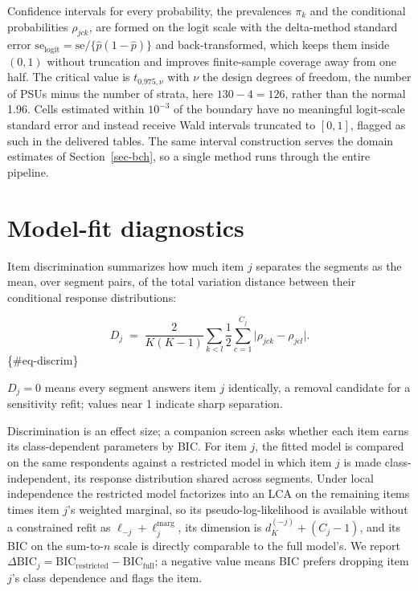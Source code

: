 \documentclass[
  12pt]{article}
\begin{document}
Confidence intervals for every probability, the prevalences \(\pi_k\)
and the conditional probabilities \(\rho_{jck}\), are formed on the
logit scale with the delta-method standard error
\(\mathrm{se}_{\mathrm{logit}} = \mathrm{se} / \{\hat p (1 - \hat p)\}\)
and back-transformed, which keeps them inside \((0, 1)\) without
truncation and improves finite-sample coverage away from one half. The
critical value is \(t_{0.975, \nu}\) with \(\nu\) the design degrees of
freedom, the number of PSUs minus the number of strata, here
\(130 - 4 = 126\), rather than the normal 1.96. Cells estimated within
\(10^{-3}\) of the boundary have no meaningful logit-scale standard
error and instead receive Wald intervals truncated to \([0, 1]\),
flagged as such in the delivered tables. The same interval construction
serves the domain estimates of Section~\ref{sec-bch}, so a single method
runs through the entire pipeline.

\section{Model-fit diagnostics}\label{sec-diagnostics}

Item discrimination summarizes how much item \(j\) separates the
segments as the mean, over segment pairs, of the total variation
distance between their conditional response distributions:

\[D_j \;=\; \frac{2}{K(K-1)} \sum_{k < l} \frac{1}{2} \sum_{c=1}^{C_j}
\big| \rho_{jck} - \rho_{jcl} \big| .\] \{\#eq-discrim\}

\(D_j = 0\) means every segment answers item \(j\) identically, a
removal candidate for a sensitivity refit; values near 1 indicate sharp
separation.

Discrimination is an effect size; a companion screen asks whether each
item earns its class-dependent parameters by BIC. For item \(j\), the
fitted model is compared on the same respondents against a restricted
model in which item \(j\) is made class-independent, its response
distribution shared across segments. Under local independence the
restricted model factorizes into an LCA on the remaining items times
item \(j\)'s weighted marginal, so its pseudo-log-likelihood is
available without a constrained refit as
\(\ell_{-j} + \ell_j^{\mathrm{marg}}\), its dimension is
\(d_K^{(-j)} + (C_j - 1)\), and its BIC on the sum-to-\(n\) scale is
directly comparable to the full model's. We report
\(\Delta\mathrm{BIC}_j = \mathrm{BIC}_{\mathrm{restricted}} - \mathrm{BIC}_{\mathrm{full}}\);
a negative value means BIC prefers dropping item \(j\)'s class
dependence and flags the item.
\end{document}
